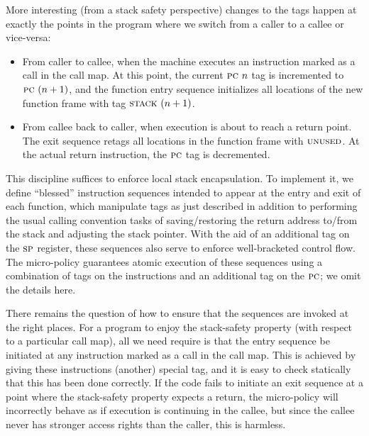 \documentclass[acmsmall,review,anonymous]{acmart}\settopmatter{printfolios=true,printccs=false,printacmref=false}
\newcommand*{\rsp}{\textsc{sp}}
\begin{document}
More interesting (from a stack safety perspective) changes to the tags
happen at exactly the points in the program where we switch from a
caller to a callee or vice-versa:

\begin{itemize}

\item From caller to callee, when the machine executes an instruction marked as a call in
  the call map.
  At this point, the current
  $\textsc{pc} ~ n$ tag is incremented to $\textsc{pc} ~ (n + 1)$, and the function
  entry sequence initializes  all locations of the new function frame with
  tag $\textsc{stack} ~ (n + 1)$.

\item From callee back to caller, when execution is about to reach a
  return point.  The exit sequence retags all locations in the
  function frame with $\textsc{unused}$. At the actual return instruction,
  the $\textsc{pc}$ tag is decremented. 

\end{itemize}

This discipline suffices to enforce local stack encapsulation.
To implement it,  we define ``blessed'' instruction sequences
intended to appear at the entry and exit of each function,
which manipulate tags as just described in addition to performing the
usual calling convention tasks of saving/restoring the return address to/from
the stack and adjusting the stack pointer. With the aid of an additional tag on
the $\rsp$ register, these sequences also serve to enforce
well-bracketed control flow.
The micro-policy guarantees atomic execution of these sequences
using a combination of tags on the instructions
and an additional tag on the $\textsc{pc}$; we omit the details here.

There remains the question of how to ensure that the sequences are
invoked at the right places. For a program to enjoy the stack-safety property
(with respect to a particular call map), all we need require is that
the entry sequence be initiated at any instruction marked as a call
in the call map. This is achieved by giving these instructions (another) special tag,
and it is easy to check statically that this has been done correctly.
If the code fails to initiate an exit
sequence at a point where the stack-safety property expects a return,
the micro-policy will incorrectly behave as if execution
is continuing in the callee, but since the callee never has stronger access
rights than the caller, this is harmless.
\end{document}

